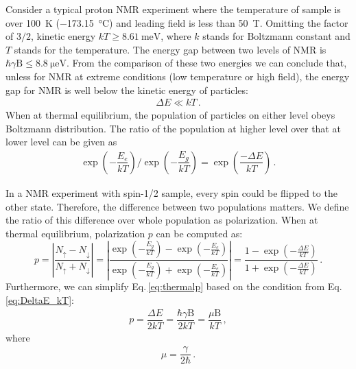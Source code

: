 Consider a typical proton NMR experiment where the temperature of sample is over \SI{100}{\kelvin} (\SI{-173.15}{\celsius}) and leading field is less than \SI{50}{\tesla}. Omitting the factor of $3/2$, kinetic energy $kT \geq \SI{8.61}{\milli\electronvolt} $, where $k$ stands for Boltzmann constant and $T$ stands for the temperature. The energy gap between two levels of NMR is $\hbar \gamma \mathrm{B} \leq \SI{8.8}{\micro\electronvolt}$. From the comparison of these two energies we can conclude that, unless for NMR at extreme conditions (low temperature or high field), the energy gap for NMR is well below the kinetic energy of particles:
\begin{align}
    \Delta E \ll kT\,.\label{eq:DeltaE_kT}
\end{align}
When at thermal equilibrium, the population of particles on either level obeys Boltzmann distribution. 
The ratio of the population at higher level over that at lower level can be given as
\begin{align}
    \exp\left(-\dfrac{E_e}{kT}\right) / \exp\left(-\dfrac{E_g}{kT}\right) = \exp\left(\dfrac{-\Delta E}{kT}\right)\,.
\end{align}

In a NMR experiment with spin-1/2 sample, every spin could be flipped to the other state. Therefore, the difference between two populations matters. We define the ratio of this difference over whole population as polarization. When at thermal equilibrium, polarization $p$ can be computed as:
\begin{equation}\label{eq:thermalp}
	p =\left| \dfrac{N_{\uparrow} - N_{\downarrow}}{N_{\uparrow} + N_{\downarrow}} \right|
	= \left|\dfrac{\exp\left(-\frac{E_g}{kT}\right) - \exp\left(-\frac{E_e}{kT}\right)}{\exp\left(-\frac{E_g}{kT}\right) +\exp\left(-\frac{E_e}{kT}\right)}\right|
	=
	\dfrac{1 - \exp\left(-\frac{\Delta E}{kT}\right)}{1 +\exp\left(-\frac{\Delta E}{kT}\right)}\,. 
\end{equation}
Furthermore, we can simplify Eq.\,\eqref{eq:thermalp} based on the condition from Eq.\,\eqref{eq:DeltaE_kT}: 
\begin{align}
	p =\dfrac{\Delta E}{2kT} =\dfrac{\hbar \gamma \mathrm{B}}{2kT} = \dfrac{\mu \mathrm{B}}{kT}\,,\label{eq:thermalp_approx}
\end{align}
where  
\begin{align}
    \mu= \dfrac{\gamma }{2 \hbar}\,.
\end{align}


